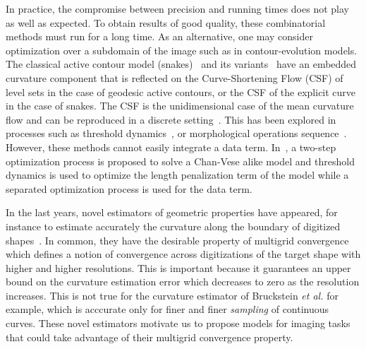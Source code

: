 \documentclass[review]{siamart220329}
\begin{document}
In practice, the compromise between precision and running times does not play as
well as expected. To obtain results of good quality, these combinatorial methods
must run for a long time. As an alternative, one may consider optimization over
a subdomain of the image such as in contour-evolution models. The classical
active contour model (snakes)~\cite{kass1988snakes} and its
variants~\cite{caseles97geodesic,chan01} have an embedded curvature component
that is reflected on the Curve-Shortening Flow (CSF) of level sets in the case
of geodesic active contours, or the CSF of the explicit curve in the case of
snakes. The CSF is the unidimensional case of the mean curvature flow and can be
reproduced in a discrete setting~\cite{merriman1992diffusion}. This has been
explored in processes such as threshold
dynamics~\cite{esedoglu2005threshold,esedoglu2008threshold}, or morphological
operations sequence~\cite{marquezneila14}. However, these methods cannot easily
integrate a data term. In~\cite{wang2017efficient}, a two-step optimization 
process is proposed to solve a Chan-Vese alike model and threshold dynamics is 
used to optimize the length penalization term of the model while a separated 
optimization process is used for the data term.

In the last years, novel estimators of geometric properties have appeared, for
instance to estimate accurately the curvature along the boundary of digitized
shapes~\cite{roussillon11mdca,schindele17mdca,coeurjolly13integral,coeurjolly12multigrid}.
In common, they have the desirable property of multigrid convergence which
defines a notion of convergence across digitizations of the target shape with
higher and higher resolutions. This is important because it guarantees an upper
bound on the curvature estimation error which decreases to zero as the
resolution increases. This is not true for the curvature estimator of Bruckstein
{\em et al.} \cite{bruckstein01convergence} for example, which is acccurate only
for finer and finer {\em sampling} of continuous curves. These novel estimators
motivate us to propose models for imaging tasks that could take advantage of
their multigrid convergence property.
%
%
%
%
\end{document}
